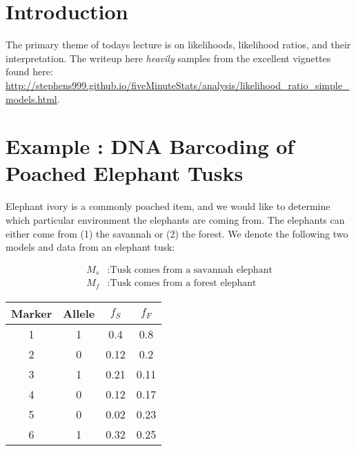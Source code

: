 \documentclass[12pt]{report}
\begin{document}
\maketitle

\vspace*{.1in}




\section{Introduction}

The primary theme of todays lecture is on likelihoods, likelihood
ratios, and their interpretation. The writeup here \textit{heavily}
samples from the excellent vignettes found here: \\
\url{http://stephens999.github.io/fiveMinuteStats/analysis/likelihood\_ratio\_simple\_models.html}. 

\section{Example : DNA Barcoding of Poached Elephant Tusks}

Elephant ivory is a commonly poached item, and we would like to determine which particular environment the elephants are coming from. The elephants can either come from (1) the savannah or (2) the forest. We denote the following two models and data from an elephant tusk:

\begin{align*}
M_s &: \text{Tusk comes from a savannah elephant}\\
M_f &: \text{Tusk comes from a forest elephant}
\end{align*}


\begin{center}
	\begin{tabular}{ c | c | c | c }
		Marker & Allele & $f_S$ & $f_F$\\
		\hline 
	  1 & 1 & 0.4 & 0.8\\
	  2 & 0 & 0.12 & 0.2\\
	  3 & 1 & 0.21 & 0.11\\
	  4 & 0 & 0.12 & 0.17\\
	  5 & 0 & 0.02 & 0.23\\
	  6 & 1 & 0.32 & 0.25\\
	\end{tabular}
\end{center}
\end{document}

